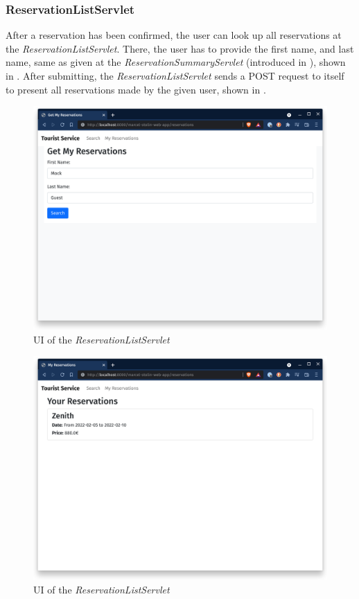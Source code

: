 \subsubsection{ReservationListServlet}\label{sec:02_design_web_myreservations}
After a reservation has been confirmed, the user can look up all reservations at the \textit{ReservationListServlet}.
There, the user has to provide the first name, and last name, same as given at the \textit{ReservationSummaryServlet} (introduced in ), shown in . After submitting, the \textit{ReservationListServlet} sends a POST request to itself to present all reservations made by the given user, shown in .

\begin{figure}[h]
\centering
\includegraphics[scale=0.14]{images/02_design/web-app-my-reservations-1}
\caption{UI of the \textit{ReservationListServlet}}
\label{fig:02_design_web_myreservations_page_1}
\end{figure}

\newpage
\begin{figure}[h]
\centering
\includegraphics[scale=0.14]{images/02_design/web-app-my-reservations-2}
\caption{UI of the \textit{ReservationListServlet}}
\label{fig:02_design_web_myreservations_page_2}
\end{figure}
